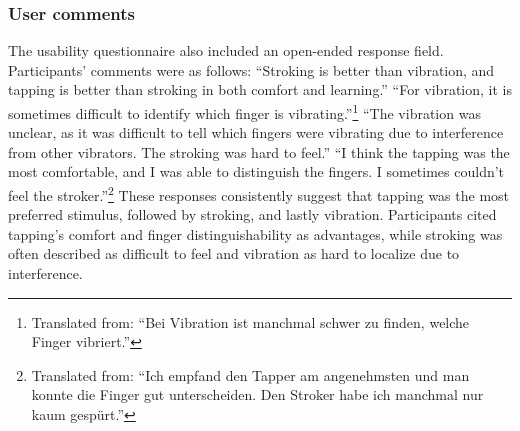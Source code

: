 \subsubsection{User comments}
The usability questionnaire also included an open-ended response field. Participants' comments were as follows:
\enquote{Stroking is better than vibration, and tapping is better than stroking in both comfort and learning.}
\enquote{For vibration, it is sometimes difficult to identify which finger is vibrating.}\footnote{Translated from: \enquote{Bei Vibration ist manchmal schwer zu finden, welche Finger vibriert.}}
\enquote{The vibration was unclear, as it was difficult to tell which fingers were vibrating due to interference from other vibrators. The stroking was hard to feel.}
\enquote{I think the tapping was the most comfortable, and I was able to distinguish the fingers. I sometimes couldn’t feel the stroker.}\footnote{Translated from: \enquote{Ich empfand den Tapper am angenehmsten und man konnte die Finger gut unterscheiden. Den Stroker habe ich manchmal nur kaum gespürt.}}
These responses consistently suggest that tapping was the most preferred stimulus, followed by stroking, and lastly vibration. Participants cited tapping’s comfort and finger distinguishability as advantages, while stroking was often described as difficult to feel and vibration as hard to localize due to interference.







